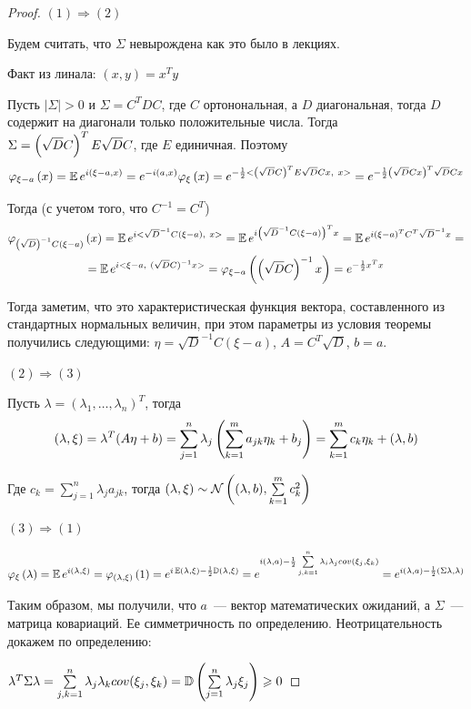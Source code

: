 \begin{proof} 
$(1) \Longrightarrow (2)$

Будем считать, что $\Sigma$ невырождена как это было в лекциях.

Факт из линала: $(x, y) = x^Ty$

Пусть $|\Sigma| > 0$ и $\Sigma = C^TDC$, где $C$ ортонональная, а $D$ диагональная, тогда $D$ содержит на диагонали только положительные числа. Тогда $\Sigma = \left({\sqrt{D}C}\right)^T E \sqrt{D}C$, где $E$ единичная. Поэтому 
$$
\varphi_{\xi - a}\left({x}\right) = \operatorname{\mathbb{E}} e^{i(\xi - a, x)} = e^{-i(a, x)}\varphi_{\xi}\left({x}\right) =  e^{-\frac{1}{2} <\left({\sqrt{D}C}\right)^T E\sqrt{D}Cx,\ x>} = e^{-\frac{1}{2} \left({\sqrt{D}Cx}\right)^T \sqrt{D} Cx} 
$$

Тогда (с учетом того, что $C^{-1} = C^T$)
\begin{multline*}
    \varphi_{\left({\sqrt{D}}\right)^{-1}C(\xi - a)}\left({x}\right) = \operatorname{\mathbb{E}} e^{i<\sqrt{D}^{-1}C(\xi - a), \  x>} = \operatorname{\mathbb{E}} e^{i\left({\sqrt{D}^{-1}C(\xi - a)}\right)^T x} = \operatorname{\mathbb{E}} e^{i(\xi - a)^T C^T\sqrt{D}^{-1}x} = \\ = \operatorname{\mathbb{E}} e^{i<\xi - a,\ (\sqrt{D}C)^{-1}x>}
    = \varphi_{\xi - a}\left({\left({\sqrt{D}C}\right)^{-1}x}\right) = e^{-\frac{1}{2}x^Tx}
\end{multline*}

Тогда заметим, что это характеристическая функция вектора, составленного из стандартных нормальных величин, при этом параметры из условия теоремы получились следующими: $\eta = \sqrt{D}^{-1}C(\xi - a)$, $A = C^T\sqrt{D}$, $b = a$.

$(2) \Longrightarrow (3)$

Пусть $\lambda = (\lambda_1, \ldots, \lambda_n)^T$, тогда 
$$
(\lambda, \xi) = \lambda^T(A\eta + b) = \sum\limits_{j = 1}^n \lambda_j \left({\sum\limits_{k = 1}^m a_{jk}\eta_k + b_j}\right) = \sum\limits_{k = 1}^m c_k\eta_k + (\lambda, b)
$$

Где $c_k = \sum\limits_{j = 1}^n \lambda_ja_{jk}$, тогда $(\lambda, \xi) \sim \mathcal{N}\left({(\lambda, b), \sum\limits_{k = 1}^m c_k^2}\right)$

$(3) \Longrightarrow (1)$

$$
\varphi_{\xi}\left({\lambda}\right) = \operatorname{\mathbb{E}} e^{i(\lambda, \xi)} = \varphi_{(\lambda, \xi)}\left({1}\right) = e^{i\operatorname{\mathbb{E}}(\lambda, \xi) - \frac{1}{2}{\mathbb{D}}(\lambda, \xi)} = e^{i(\lambda, a) - \frac{1}{2}\sum\limits_{j, k = 1}^n\lambda_i\lambda_j cov(\xi_j, \xi_k)} = e^{i(\lambda, a) - \frac{1}{2}(\Sigma\lambda, \lambda)}
$$

Таким образом, мы получили, что $a$~--- вектор математических ожиданий, а $\Sigma$~--- матрица ковариаций. Ее симметричность по определению. Неотрицательность докажем по определению:

$
\lambda^T\Sigma\lambda = \sum\limits_{j, k = 1}^n \lambda_j\lambda_k cov(\xi_j, \xi_k) = {\mathbb{D}}\left({\sum\limits_{j = 1}^n \lambda_j\xi_j}\right) \geqslant 0
$\end{proof}

